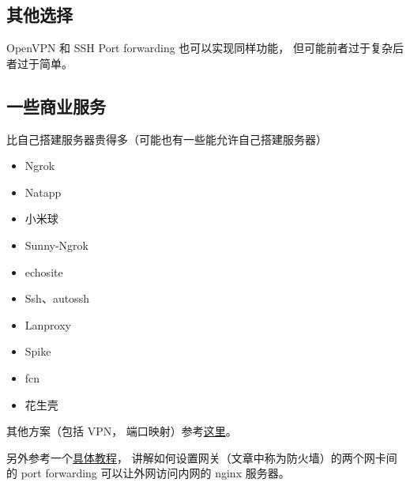 \subsection{其他选择}
OpenVPN 和 SSH Port forwarding 也可以实现同样功能， 但可能前者过于复杂后者过于简单。

\subsection{一些商业服务}
比自己搭建服务器贵得多（可能也有一些能允许自己搭建服务器）
\begin{itemize}
\item Ngrok
\item Natapp
\item 小米球
\item Sunny-Ngrok
\item echosite
\item Ssh、autossh
\item Lanproxy
\item Spike
\item fcn
\item 花生壳
\end{itemize}

其他方案（包括 VPN， 端口映射）参考\href{https://johackim.com/how-to-expose-local-server-behind-firewall}{这里}。

另外参考一个\href{https://www.digitalocean.com/community/tutorials/how-to-forward-ports-through-a-linux-gateway-with-iptables}{具体教程}， 讲解如何设置网关（文章中称为防火墙）的两个网卡间的 port forwarding 可以让外网访问内网的 nginx 服务器。 
